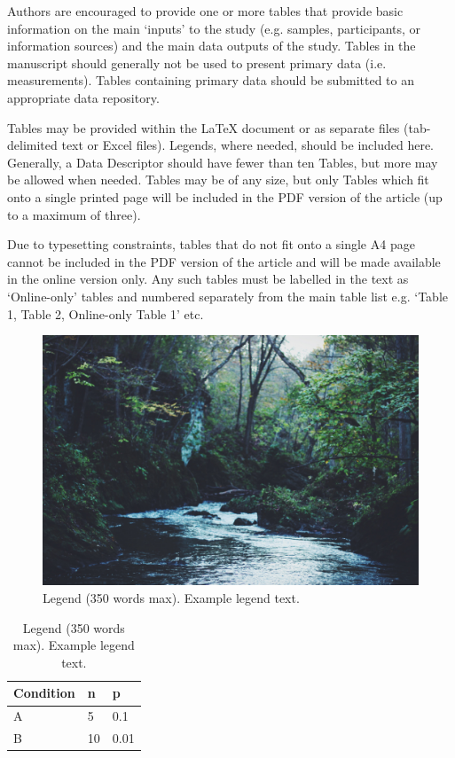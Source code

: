 \documentclass[fleqn,10pt]{wlscirep}
\begin{document}
Authors are encouraged to provide one or more tables that provide basic information on
the main ‘inputs’ to the study (e.g. samples, participants, or information sources) and
the main data outputs of the study. Tables in the manuscript should generally not be
used to present primary data (i.e. measurements). Tables containing primary data should
be submitted to an appropriate data repository.

Tables may be provided within the \LaTeX{} document or as separate files (tab-delimited
text or Excel files). Legends, where needed, should be included here. Generally, a Data
Descriptor should have fewer than ten Tables, but more may be allowed when needed.
Tables may be of any size, but only Tables which fit onto a single printed page will be
included in the PDF version of the article (up to a maximum of three).

Due to typesetting constraints, tables that do not fit onto a single A4 page cannot be
included in the PDF version of the article and will be made available in the online
version only. Any such tables must be labelled in the text as ‘Online-only’ tables and
numbered separately from the main table list e.g. ‘Table 1, Table 2, Online-only Table
1’ etc.

\begin{figure}[ht]
\centering
\includegraphics[width=\linewidth]{stream}
\caption{Legend (350 words max). Example legend text.}
\label{fig:stream}
\end{figure}


\begin{table}[ht]
\centering
\begin{tabular}{|l|l|l|}
\hline
Condition & n & p \\
\hline
A & 5 & 0.1 \\
\hline
B & 10 & 0.01 \\
\hline
\end{tabular}
\caption{\label{tab:example}Legend (350 words max). Example legend text.}
\end{table}
\end{document}
